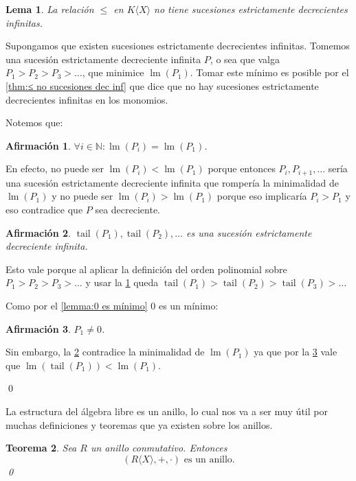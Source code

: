 \documentclass[12pt]{report}
\theoremstyle{customstyle}
\newtheorem{theorem}{Teorema}[chapter]
\newtheorem{lemma}[theorem]{Lema}
\renewenvironment{proof}[1][\proofname]{{\noindent \bfseries #1: }}{\qed} %
\theoremstyle{factstyle}
\newtheorem{fact}{Afirmación}[theorem]
\DeclareMathOperator{\lm}{lm}
\DeclareMathOperator{\tail}{tail}
\begin{document}
\begin{lemma}\label{lemma:≤ en KX no sucesiones dec inf}
  La relación $≤$ en $K⟨X⟩$ no tiene sucesiones estrictamente decrecientes infinitas.
\end{lemma}
\begin{proof}
  Supongamos que existen sucesiones estrictamente decrecientes infinitas. Tomemos una sucesión estrictamente decreciente infinita $P$, o sea que valga $P_1 > P_2 > P_3 > …$, que minimice $\lm(P_1)$. Tomar este mínimo es posible por el \cref{thm:≤ no sucesiones dec inf} que dice que no hay sucesiones estrictamente decrecientes infinitas en los monomios.

  Notemos que:

  \begin{fact}\label{fact:≤ en KX no sucesiones dec inf:1}
    $∀i ∈ ℕ : \lm(P_i) = \lm(P_1)$.
  \end{fact}
  En efecto, no puede ser $\lm(P_i) < \lm(P_1)$ porque entonces $P_i, P_{i + 1}, …$ sería una sucesión estrictamente decreciente infinita que rompería la minimalidad de $\lm(P_1)$ y no puede ser $\lm(P_i) > \lm(P_1)$ porque eso implicaría $P_i > P_1$ y eso contradice que $P$ sea decreciente.

  \begin{fact}\label{fact:≤ en KX no sucesiones dec inf:2}
    $\tail(P_1), \tail(P_2), …$ es una sucesión estrictamente decreciente infinita.
  \end{fact}
  Esto vale porque al aplicar la definición del orden polinomial sobre $P_1 > P_2 > P_3 > …$ y usar la \cref{fact:≤ en KX no sucesiones dec inf:1} queda $\tail(P_1) > \tail(P_2) > \tail(P_3) > …$

  Como por el \cref{lemma:0 es mínimo} $0$ es un mínimo:

  \begin{fact}\label{fact:≤ en KX no sucesiones dec inf:3}
    $P_1 ≠ 0$.
  \end{fact}

  Sin embargo, la \cref{fact:≤ en KX no sucesiones dec inf:2} contradice la minimalidad de $\lm(P_1)$ ya que por la \cref{fact:≤ en KX no sucesiones dec inf:3} vale que $\lm(\tail(P_1)) < \lm(P_1)$.

\end{proof}

La estructura del álgebra libre es un anillo, lo cual nos va a ser muy útil por muchas definiciones y teoremas que ya existen sobre los anillos.

\begin{theorem}
  Sea $R$ un anillo conmutativo. Entonces
  \[ (R⟨X⟩, +, ·)\text{ es un anillo} \text{.}\]
  \qed
\end{theorem}
\end{document}
